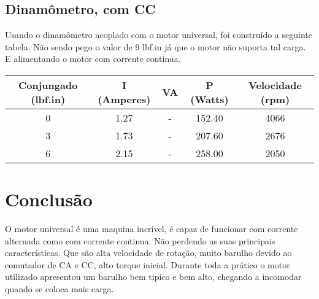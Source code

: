 \documentclass[paper=a4, fontsize=11pt]{article}
\begin{document}
\subsection{Dinamômetro, com CC}

Usando o dinamômetro acoplado com o motor universal, foi construído 
a seguinte tabela. Não sendo pego o valor de 9 lbf.in já que o 
motor não suporta tal carga. E alimentando o motor com corrente 
continua.

\begin{center}
    \begin{tabular}{c|c|c|c|c}
            Conjungado (lbf.in) & I (Amperes) & VA & P (Watts) & Velocidade (rpm) \\
            \hline
            0 & 1.27 & - & 152.40 & 4066 \\
            3 & 1.73 & - & 207.60 & 2676 \\
            6 & 2.15 & - & 258.00 & 2050 \\
    \end{tabular}
\end{center}


\section{Conclusão}

O motor universal é uma maquina incrível, é capaz de funcionar com 
corrente alternada como com corrente continua. Não perdendo as suas 
principais características. Que são alta velocidade de rotação, 
muito barulho devido ao comutador de CA e CC, alto torque inicial.
Durante toda a prático o motor utilizado apresentou um barulho 
bem tipico e bem alto, chegando a incomodar quando se coloca mais
carga. 
\end{document}
